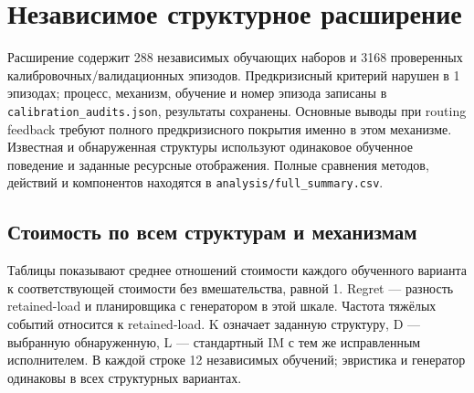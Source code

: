 \clearpage

\section{Независимое структурное расширение}

Расширение содержит 288 независимых обучающих наборов и 3168 проверенных калибровочных/валидационных эпизодов. Предкризисный критерий нарушен в 1 эпизодах; процесс, механизм, обучение и номер эпизода записаны в \texttt{calibration\_audits.json}, результаты сохранены. Основные выводы при routing feedback требуют полного предкризисного покрытия именно в этом механизме. Известная и обнаруженная структуры используют одинаковое обученное поведение и заданные ресурсные отображения. Полные сравнения методов, действий и компонентов находятся в \texttt{analysis/full\_summary.csv}.

\subsection{Стоимость по всем структурам и механизмам}

Таблицы показывают среднее отношений стоимости каждого обученного варианта к соответствующей стоимости без вмешательства, равной 1. Regret — разность retained-load и планировщика с генератором в этой шкале. Частота тяжёлых событий относится к retained-load. K означает заданную структуру, D — выбранную обнаруженную, L — стандартный IM с тем же исправленным исполнителем. В каждой строке 12 независимых обучений; эвристика и генератор одинаковы в всех структурных вариантах.

